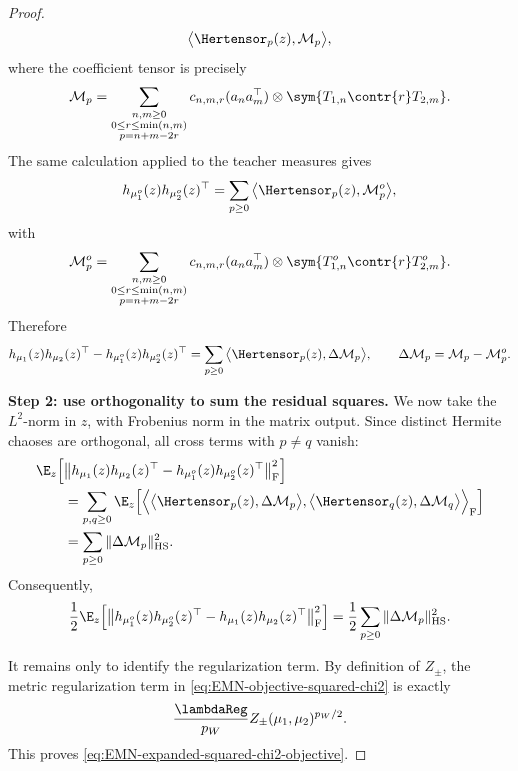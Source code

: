 \begin{proof}
\begin{equation}
    \big\langle \Hertensor_p(z),\mathcal M_p\big\rangle,
\end{equation}
where the coefficient tensor is precisely
\begin{equation}
    \mathcal M_p
    =
    \sum_{\substack{n,m\ge0\\0\le r\le \min(n,m)\\p=n+m-2r}}
    c_{n,m,r}
    (a_na_m^\top)\otimes
    \sym{T_{1,n}\contr{r}T_{2,m}}.
\end{equation}
The same calculation applied to the teacher measures gives
\begin{equation}
    h_{\mu_1^o}(z)h_{\mu_2^o}(z)^\top
    =
    \sum_{p\ge0}
    \big\langle \Hertensor_p(z),\mathcal M_p^o\big\rangle,
\end{equation}
with
\begin{equation}
    \mathcal M_p^o
    =
    \sum_{\substack{n,m\ge0\\0\le r\le \min(n,m)\\p=n+m-2r}}
    c_{n,m,r}
    (a_na_m^\top)\otimes
    \sym{T_{1,n}^o\contr{r}T_{2,m}^o}.
\end{equation}
Therefore
\begin{equation}
    h_{\mu_1}(z)h_{\mu_2}(z)^\top
    -
    h_{\mu_1^o}(z)h_{\mu_2^o}(z)^\top
    =
    \sum_{p\ge0}
    \big\langle \Hertensor_p(z),\Delta\mathcal M_p\big\rangle,
    \qquad
    \Delta\mathcal M_p=\mathcal M_p-\mathcal M_p^o .
\end{equation}

\par\noindent\textbf{Step 2: use orthogonality to sum the residual squares.}
We now take the \(L^2\)-norm in \(z\), with Frobenius norm in the
matrix output.  Since distinct Hermite chaoses are orthogonal, all
cross terms with \(p\neq q\) vanish:
\begin{align}
    &\E_z
    \Big[
        \big\|
        h_{\mu_1}(z)h_{\mu_2}(z)^\top
        -
        h_{\mu_1^o}(z)h_{\mu_2^o}(z)^\top
        \big\|_{\mathrm F}^2
    \Big]
    \notag\\
    &\qquad =
    \sum_{p,q\ge0}
    \E_z
    \Big[
        \Big\langle
            \big\langle \Hertensor_p(z),\Delta\mathcal M_p\big\rangle,
            \big\langle \Hertensor_q(z),\Delta\mathcal M_q\big\rangle
        \Big\rangle_{\mathrm F}
    \Big]
    \notag\\
    &\qquad =
    \sum_{p\ge0}
    \|\Delta\mathcal M_p\|_{\mathrm{HS}}^2 .
\end{align}
Consequently,
\begin{equation}
    \frac12
    \E_z
    \Big[
        \big\|
        h_{\mu_1^o}(z)h_{\mu_2^o}(z)^\top
        -
        h_{\mu_1}(z)h_{\mu_2}(z)^\top
        \big\|_{\mathrm F}^2
    \Big]
    =
    \frac12
    \sum_{p\ge0}
    \|\Delta\mathcal M_p\|_{\mathrm{HS}}^2 .
\end{equation}

It remains only to identify the regularization term.  By definition of
\(Z_\pm\), the metric regularization term in \eqref{eq:EMN-objective-squared-chi2} is exactly
\[
    \frac{\lambdaReg}{p_W}Z_\pm(\mu_1,\mu_2)^{p_W/2}.
\]
This proves \eqref{eq:EMN-expanded-squared-chi2-objective}.
\end{proof}

